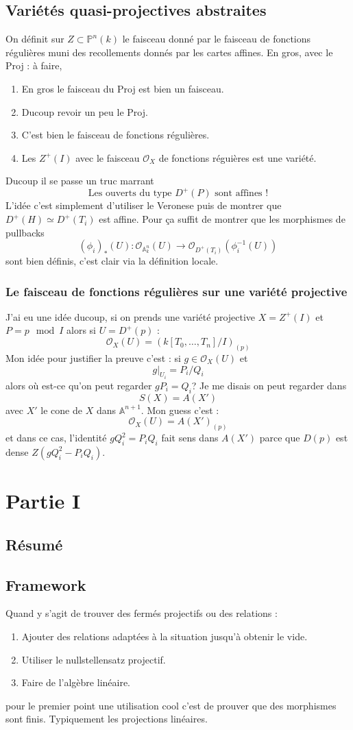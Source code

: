\documentclass[a4paper,12pt]{book}
\newcommand{\A}{\mathbb{A}}
\newcommand{\Or}{\mathcal{O}}
\renewcommand{\P}{\mathbb{P}}
\theoremstyle{plain}
\theoremstyle{definition}
\theoremstyle{remark}
\begin{document}
\section{Variétés quasi-projectives abstraites}
On définit sur $Z\subset \P^n(k)$ le faisceau donné par le faisceau
de fonctions régulières muni des recollements donnés par les cartes 
affines. En gros, avec le Proj : à faire,
\begin{enumerate}
    \item En gros le faisceau du Proj est bien un faisceau.
    \item Ducoup revoir un peu le Proj.
    \item C'est bien le faisceau de fonctions régulières.
    \item Les $Z^+(I)$ avec le faisceau $\Or_X$ de fonctions réguières
	est une variété.
\end{enumerate}
Ducoup il se passe un truc marrant
\[\textrm{Les ouverts du type $D^+(P)$ sont affines !}\]
L'idée c'est simplement d'utiliser le Veronese puis de montrer que 
$D^+(H)\simeq D^+(T_i)$ est affine. Pour ça suffit de montrer que
les morphismes de pullbacks 
\[(\phi_i)_*(U)\colon \Or_{\A^n_k}(U)\to \Or_{D^+(T_i)}(\phi_i^{-1}(U))\]
sont bien définis, c'est clair via la définition locale.  
\subsection{Le faisceau de fonctions régulières sur une variété
projective}
J'ai eu une idée ducoup, si on prends une variété projective $X=Z^+(I)$
et $P=p\mod I$ alors si $U=D^+(p)$ :
\[\Or_X(U)=(k[T_0,\ldots, T_n]/I)_{(p)}\]
Mon idée pour justifier la preuve c'est : si $g\in \Or_X(U)$ et 
\[g|_{U_i}=P_i/Q_i\]
 alors où est-ce qu'on peut regarder $gP_i=Q_i$? Je me disais on peut 
 regarder dans 
 \[S(X)=A(X')\]
 avec $X'$ le cone de $X$ dans $\A^{n+1}$. Mon guess c'est :
\[\Or_X(U)=A(X')_{(p)}\]
et dans ce cas, l'identité $gQ_i^2=P_iQ_i$ fait sens dans $A(X')$
parce que $D(p)$ est dense $Z(gQ_i^2-P_iQ_i)$.


\chapter{Partie I}
\section{Résumé}
\section{Framework}
Quand y s'agit de trouver des fermés projectifs ou des relations :
\begin{enumerate}
    \item Ajouter des relations adaptées à la situation jusqu'à obtenir
	le vide.
    \item Utiliser le nullstellensatz projectif.
    \item Faire de l'algèbre linéaire.
\end{enumerate}
pour le premier point une utilisation cool c'est de prouver que des
morphismes sont finis. Typiquement les projections linéaires.
\end{document}
